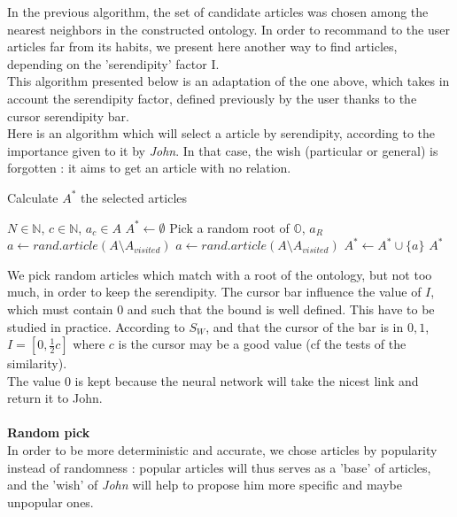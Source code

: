 \documentclass[11pt]{article}
\theoremstyle{plain}
\theoremstyle{definition}
\theoremstyle{remark}
\begin{document}
In the previous algorithm, the set of candidate articles was chosen among the nearest neighbors in the constructed ontology.
In order to recommand to the user articles far from its habits, we present here another way to find articles, depending on the 'serendipity' factor I.\\
This algorithm presented below is an adaptation of the one above, which takes in account the serendipity factor, defined previously by the user thanks to the cursor serendipity bar. \\
Here is an algorithm which will select a article by serendipity, according to the importance given to it by \textit{John}. In that case, the wish (particular or general) is forgotten : it aims to get an article with no relation. 

\begin{algorithm}
  \caption{Calculate $A^*$ the selected articles}
  \begin{algorithmic}
    \REQUIRE $N \in \mathbb{N}$, $c \in \mathbb{N}$, $a_c\in A$
    \STATE $A^* \leftarrow \emptyset$
    \STATE Pick a random root of $\mathbb{O}$, $a_R$
    \STATE $a \leftarrow rand.article(A\setminus A_{visited})$
    \STATE $a 
    \leftarrow rand.article(A\setminus A_{visited})$
    \ENDWHILE
    \STATE $ A^* \leftarrow A^* \cup {\{a}\}$
    \ENDWHILE
    \RETURN $A^*$
  \end{algorithmic}
\end{algorithm}

We pick random articles which match with a root of the ontology, but not too much, in order to keep the serendipity. The cursor bar influence the value of $I$, which must contain $0$ and such that the bound is well defined. This have to be studied in practice. According to $S_W$, and that the cursor of the bar is in $0,1$, $I=[0,\frac{1}{2}c]$ where $c$ is the cursor may be a good value (cf the tests of the similarity).\\
The value $0$ is kept because the neural network will take the nicest link and return it to John.\\\\

\textbf{Random pick}\\
In order to be more deterministic and accurate, we chose articles by popularity instead of randomness : popular articles will thus serves as a 'base' of articles, and the 'wish' of \textit{John} will help to propose him more specific and maybe unpopular ones.\\
\end{document}
